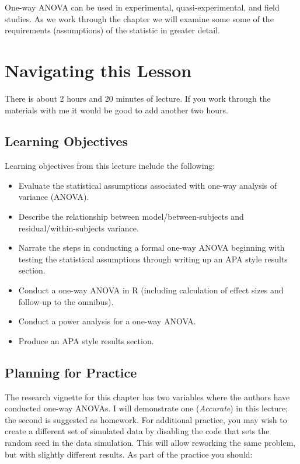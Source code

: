 \documentclass[
  english,
]{book}
\providecommand{\tightlist}{%
  \setlength{\itemsep}{0pt}\setlength{\parskip}{0pt}}
\begin{document}
One-way ANOVA can be used in experimental, quasi-experimental, and field studies. As we work through the chapter we will examine some some of the requirements (assumptions) of the statistic in greater detail.

\hypertarget{navigating-this-lesson}{%
\section{Navigating this Lesson}\label{navigating-this-lesson}}

There is about 2 hours and 20 minutes of lecture. If you work through the materials with me it would be good to add another two hours.

\hypertarget{learning-objectives}{%
\subsection{Learning Objectives}\label{learning-objectives}}

Learning objectives from this lecture include the following:

\begin{itemize}
\tightlist
\item
  Evaluate the statistical assumptions associated with one-way analysis of variance (ANOVA).
\item
  Describe the relationship between model/between-subjects and residual/within-subjects variance.
\item
  Narrate the steps in conducting a formal one-way ANOVA beginning with testing the statistical assumptions through writing up an APA style results section.
\item
  Conduct a one-way ANOVA in R (including calculation of effect sizes and follow-up to the omnibus).
\item
  Conduct a power analysis for a one-way ANOVA.
\item
  Produce an APA style results section.
\end{itemize}

\hypertarget{planning-for-practice}{%
\subsection{Planning for Practice}\label{planning-for-practice}}

The research vignette for this chapter \citep{tran_you_2014} has two variables where the authors have conducted one-way ANOVAs. I will demonstrate one (\emph{Accurate}) in this lecture; the second is suggested as homework. For additional practice, you may wish to create a different set of simulated data by disabling the code that sets the random seed in the data simulation. This will allow reworking the same problem, but with slightly different results. As part of the practice you should:
\end{document}
